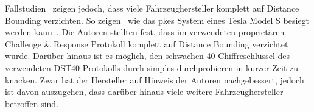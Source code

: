 Fallstudien~\cite{Wouters2019,ADAC2022} zeigen jedoch, dass viele Fahrzeughersteller komplett auf \foreignlanguage{english}{Distance Bounding} verzichten. So zeigen~\citeauthor{Wouters2019} wie das \gls{pkes} System eines Tesla Model S besiegt werden kann~\cite{Wouters2019}. Die Autoren stellten fest, dass im verwendeten proprietären \foreignlanguage{english}{Challenge \& Response} Protokoll komplett auf \foreignlanguage{english}{Distance Bounding} verzichtet wurde. Darüber hinaus ist es möglich, den schwachen \SI{40}{\bit} Chiffreschlüssel des verwendeten DST40 Protokolls durch simples durchprobieren in kurzer Zeit zu knacken. Zwar hat der Hersteller auf Hinweis der Autoren nachgebessert, jedoch ist davon auszugehen, dass darüber hinaus viele weitere Fahrzeughersteller betroffen sind.
